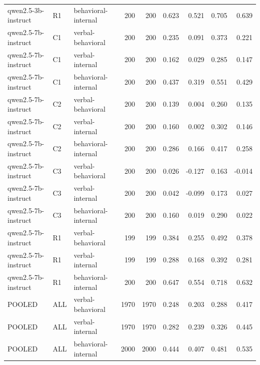\begin{table}
\begin{tabular}{lllrrrrrr}
qwen2.5-3b-instruct & R1 & behavioral-internal & 200 & 200 & 0.623 & 0.521 & 0.705 & 0.639 \\
qwen2.5-7b-instruct & C1 & verbal-behavioral & 200 & 200 & 0.235 & 0.091 & 0.373 & 0.221 \\
qwen2.5-7b-instruct & C1 & verbal-internal & 200 & 200 & 0.162 & 0.029 & 0.285 & 0.147 \\
qwen2.5-7b-instruct & C1 & behavioral-internal & 200 & 200 & 0.437 & 0.319 & 0.551 & 0.429 \\
qwen2.5-7b-instruct & C2 & verbal-behavioral & 200 & 200 & 0.139 & 0.004 & 0.260 & 0.135 \\
qwen2.5-7b-instruct & C2 & verbal-internal & 200 & 200 & 0.160 & 0.002 & 0.302 & 0.146 \\
qwen2.5-7b-instruct & C2 & behavioral-internal & 200 & 200 & 0.286 & 0.166 & 0.417 & 0.258 \\
qwen2.5-7b-instruct & C3 & verbal-behavioral & 200 & 200 & 0.026 & -0.127 & 0.163 & -0.014 \\
qwen2.5-7b-instruct & C3 & verbal-internal & 200 & 200 & 0.042 & -0.099 & 0.173 & 0.027 \\
qwen2.5-7b-instruct & C3 & behavioral-internal & 200 & 200 & 0.160 & 0.019 & 0.290 & 0.022 \\
qwen2.5-7b-instruct & R1 & verbal-behavioral & 199 & 199 & 0.384 & 0.255 & 0.492 & 0.378 \\
qwen2.5-7b-instruct & R1 & verbal-internal & 199 & 199 & 0.288 & 0.168 & 0.392 & 0.281 \\
qwen2.5-7b-instruct & R1 & behavioral-internal & 200 & 200 & 0.647 & 0.554 & 0.718 & 0.632 \\
POOLED & ALL & verbal-behavioral & 1970 & 1970 & 0.248 & 0.203 & 0.288 & 0.417 \\
POOLED & ALL & verbal-internal & 1970 & 1970 & 0.282 & 0.239 & 0.326 & 0.445 \\
POOLED & ALL & behavioral-internal & 2000 & 2000 & 0.444 & 0.407 & 0.481 & 0.535 \\
\bottomrule
\end{tabular}
\end{table}
